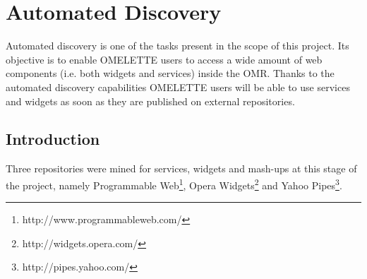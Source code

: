 \section{Automated Discovery}
\label{sec:enableautomated}

Automated discovery is one of the tasks present in the scope of this project. Its objective is to enable OMELETTE users to access a wide amount of web components (i.e. both widgets and services) inside the OMR. Thanks to the automated discovery capabilities OMELETTE users will be able to use services and widgets as soon as they are published on external repositories.


\subsection{Introduction}

Three repositories were mined for services, widgets and mash-ups at this stage of the project,
namely Programmable Web\footnote{http://www.programmableweb.com/}, Opera Widgets\footnote{http://widgets.opera.com/} and Yahoo Pipes\footnote{http://pipes.yahoo.com/}.


